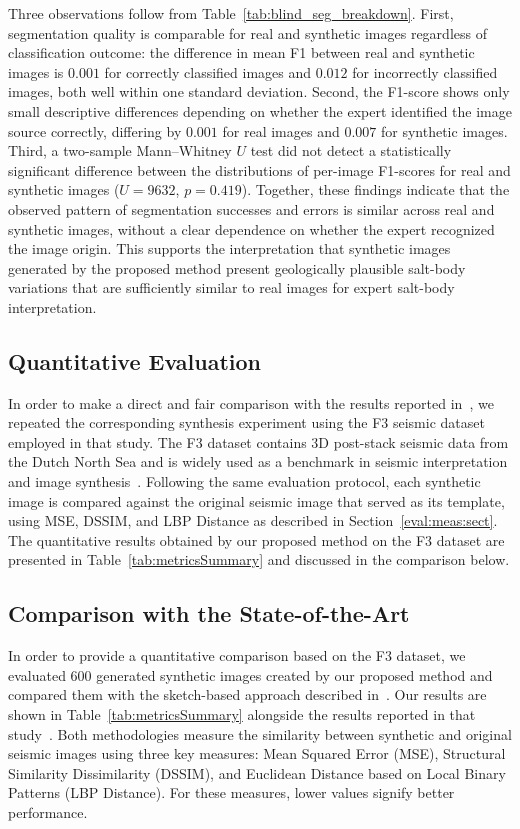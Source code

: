 \documentclass{ieeeaccess}
\begin{document}
Three observations follow from Table~\ref{tab:blind_seg_breakdown}. First, segmentation quality is comparable for real and synthetic images regardless of classification outcome: the difference in mean F1 between real and synthetic images is $0.001$ for correctly classified images and $0.012$ for incorrectly classified images, both well within one standard deviation. Second, the F1-score shows only small descriptive differences depending on whether the expert identified the image source correctly, differing by $0.001$ for real images and $0.007$ for synthetic images. Third, a two-sample Mann--Whitney $U$ test did not detect a statistically significant difference between the distributions of per-image F1-scores for real and synthetic images ($U = 9632$, $p = 0.419$). Together, these findings indicate that the observed pattern of segmentation successes and errors is similar across real and synthetic images, without a clear dependence on whether the expert recognized the image origin. This supports the interpretation that synthetic images generated by the proposed method present geologically plausible salt-body variations that are sufficiently similar to real images for expert salt-body interpretation.

\subsection{Quantitative Evaluation}

In order to make a direct and fair comparison with the results reported in~\cite{Ferreira2020}, we repeated the corresponding synthesis experiment using the F3 seismic dataset employed in that study. The F3 dataset contains 3D post-stack seismic data from the Dutch North Sea and is widely used as a benchmark in seismic interpretation and image synthesis~\cite{Baroni2018}. Following the same evaluation protocol, each synthetic image is compared against the original seismic image that served as its template, using MSE, DSSIM, and LBP Distance as described in Section~\ref{eval:meas:sect}. The quantitative results obtained by our proposed method on the F3 dataset are presented in Table~\ref{tab:metricsSummary} and discussed in the comparison below.


\subsection{Comparison with the State-of-the-Art}

In order to provide a quantitative comparison based on the F3 dataset, we evaluated 600 generated synthetic images created by our proposed method and compared them with the sketch-based approach described in~\cite{Ferreira2020}. Our results are shown in Table~\ref{tab:metricsSummary} alongside the results reported in that study~\cite{Ferreira2020}. Both methodologies measure the similarity between synthetic and original seismic images using three key measures: Mean Squared Error (MSE), Structural Similarity Dissimilarity (DSSIM), and Euclidean Distance based on Local Binary Patterns (LBP Distance). For these measures, lower values signify better performance.
\end{document}
